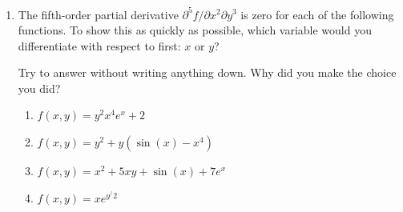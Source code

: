 {\begin{enumerate}
\begin{enumerate}
		\textbf{Note:} The graph of this function is a surface (in this case all of $\R^2$) parameterized by two variables just like the graph of the function in (b) is a curve parameterized by one variable - we'll see these more later!  Another way of thinking about this is that this is a \textit{change of variables} for $\R^2$ between the system of coordinates $(s,t)$ and $(x,y)$.
	\end{enumerate}
	
	\item The fifth-order partial derivative $\partial^5f/\partial x^2\partial y^3$ is zero for each of the following functions.  To show this as quickly as possible, which variable would you differentiate with respect to first: $x$ or $y$?
	
	Try to answer without writing anything down.  Why did you make the choice you did?
	
	\begin{enumerate}
		\item $f(x,y)=y^2x^4e^x+2$
		
		\item $f(x,y)=y^2+y(\sin(x)-x^4)$
		
		\item $f(x,y)=x^2+5xy+\sin(x)+7e^x$
		
		\item $f(x,y)=xe^{y^/2}$
	\end{enumerate}
\end{enumerate}
}{}

